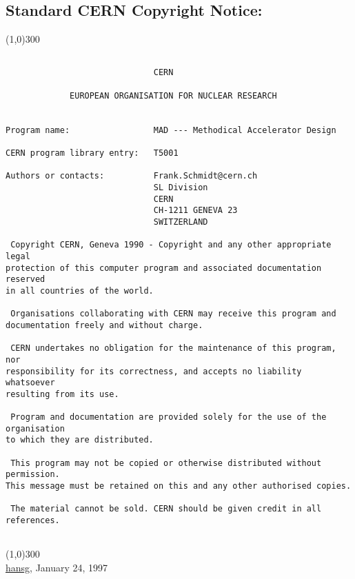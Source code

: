 






\subsection{Standard CERN Copyright Notice:}

\line(1,0){300}

\begin{verbatim}

                              CERN

             EUROPEAN ORGANISATION FOR NUCLEAR RESEARCH


Program name:                 MAD --- Methodical Accelerator Design

CERN program library entry:   T5001

Authors or contacts:          Frank.Schmidt@cern.ch
                              SL Division
                              CERN
                              CH-1211 GENEVA 23
                              SWITZERLAND

 Copyright CERN, Geneva 1990 - Copyright and any other appropriate legal
protection of this computer program and associated documentation reserved
in all countries of the world. 

 Organisations collaborating with CERN may receive this program and
documentation freely and without charge. 

 CERN undertakes no obligation for the maintenance of this program, nor
responsibility for its correctness, and accepts no liability whatsoever
resulting from its use. 

 Program and documentation are provided solely for the use of the organisation
to which they are distributed. 

 This program may not be copied or otherwise distributed without permission.
This message must be retained on this and any other authorised copies. 

 The material cannot be sold. CERN should be given credit in all references. 


\end{verbatim}

\line(1,0){300}
\\
\href{http://www.cern.ch/hansg/hansg_sign.html}{hansg}, January 24, 1997 

